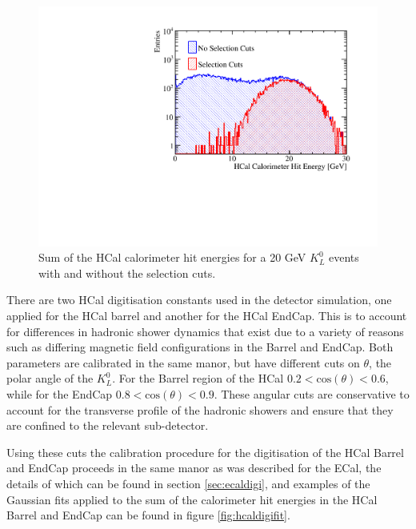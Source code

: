 \begin{figure}
\includegraphics[width=\largefigwidth]{EnergyEstimators/Plots/Calibration/Digitsation/HCal/DigitisationHCalSelection.pdf}
\caption[Sum of the HCal calorimeter hit energies for a 20 GeV $K^{0}_{L}$ events with and without the selection cuts.]{Sum of the HCal calorimeter hit energies for a 20 GeV $K^{0}_{L}$ events with and without the selection cuts.}
\label{fig:hcaldigiselection}
\end{figure}

There are two HCal digitisation constants used in the detector simulation, one applied for the HCal barrel and another for the HCal EndCap.  This is to account for differences in hadronic shower dynamics that exist due to a variety of reasons such as differing magnetic field configurations in the Barrel and EndCap.  Both parameters are calibrated in the same manor, but have different cuts on $\theta$, the polar angle of the $K^{0}_{L}$.  For the Barrel region of the HCal $0.2 < \text{cos}(\theta) < 0.6$, while for the EndCap $0.8 < \text{cos}(\theta) < 0.9$.  These angular cuts are conservative to account for the transverse profile of the hadronic showers and ensure that they are confined to the relevant sub-detector.

Using these cuts the calibration procedure for the digitisation of the HCal Barrel and EndCap proceeds in the same manor as was described for the ECal, the details of which can be found in section \ref{sec:ecaldigi}, and examples of the Gaussian fits applied to the sum of the calorimeter hit energies in the HCal Barrel and EndCap can be found in figure \ref{fig:hcaldigifit}. 

